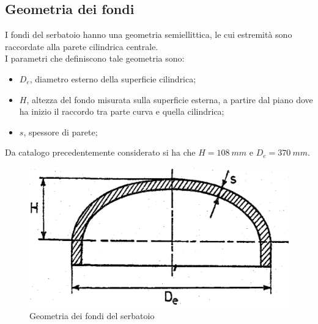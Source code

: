\subsection{Geometria dei fondi}
I fondi del serbatoio hanno una geometria semiellittica, le cui estremità sono raccordate alla parete cilindrica centrale.\\
I parametri che definiscono tale geometria sono:
\begin{itemize}
    \item $D_e$, diametro esterno della superficie cilindrica;
    \item $H$, altezza del fondo misurata sulla superficie esterna, a partire dal piano dove ha inizio il raccordo tra parte curva e quella cilindrica;
    \item $s$, spessore di parete;
\end{itemize}
Da catalogo precedentemente considerato si ha che $H=108\ mm$ e $D_e=370\ mm$.
\begin{figure}[h]
    \centering
    \includegraphics[scale=0.25]{Immagini/FondoSerbatoio.png}
    \caption{Geometria dei fondi del serbatoio}
    \label{fig:FondoSerbatoio}
\end{figure}
